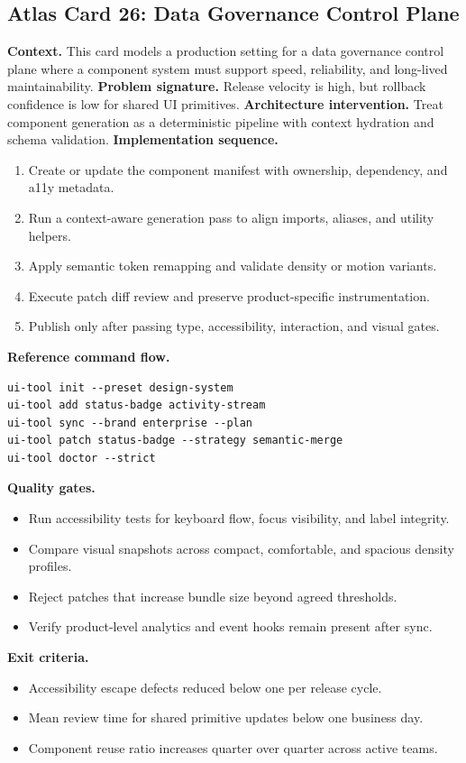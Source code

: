 \subsection*{Atlas Card 26: Data Governance Control Plane}
\textbf{Context.} This card models a production setting for a data governance control plane where a component system must support speed, reliability, and long-lived maintainability.
\textbf{Problem signature.} Release velocity is high, but rollback confidence is low for shared UI primitives.
\textbf{Architecture intervention.} Treat component generation as a deterministic pipeline with context hydration and schema validation.
\textbf{Implementation sequence.}
\begin{enumerate}[leftmargin=*, itemsep=0.28em]
  \item Create or update the component manifest with ownership, dependency, and a11y metadata.
  \item Run a context-aware generation pass to align imports, aliases, and utility helpers.
  \item Apply semantic token remapping and validate density or motion variants.
  \item Execute patch diff review and preserve product-specific instrumentation.
  \item Publish only after passing type, accessibility, interaction, and visual gates.
\end{enumerate}
\textbf{Reference command flow.}
\begin{verbatim}
ui-tool init --preset design-system
ui-tool add status-badge activity-stream
ui-tool sync --brand enterprise --plan
ui-tool patch status-badge --strategy semantic-merge
ui-tool doctor --strict
\end{verbatim}
\textbf{Quality gates.}
\begin{itemize}[leftmargin=*, itemsep=0.24em]
  \item Run accessibility tests for keyboard flow, focus visibility, and label integrity.
  \item Compare visual snapshots across compact, comfortable, and spacious density profiles.
  \item Reject patches that increase bundle size beyond agreed thresholds.
  \item Verify product-level analytics and event hooks remain present after sync.
\end{itemize}
\textbf{Exit criteria.}
\begin{itemize}[leftmargin=*, itemsep=0.24em]
  \item Accessibility escape defects reduced below one per release cycle.
  \item Mean review time for shared primitive updates below one business day.
  \item Component reuse ratio increases quarter over quarter across active teams.
\end{itemize}
\clearpage
